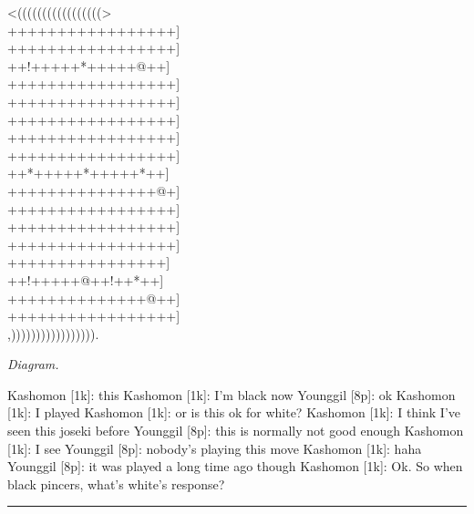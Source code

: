 \documentclass[letterpaper,12pt]{memoir}
\newcounter{GoFigure}[part]
\newcommand{\gofigure}{%
 \stepcounter{GoFigure}
 \centerline{\textit{Diagram.\thinspace\arabic{GoFigure}}}
}
\begin{document}
\begin{minipage}[t]{0.5\textwidth}
{\gnos
<(((((((((((((((((>\\
+++++++++++++++++]\\
+++++++++++++++++]\\
++!+++++*+++++@++]\\
+++++++++++++++++]\\
+++++++++++++++++]\\
+++++++++++++++++]\\
+++++++++++++++++]\\
+++++++++++++++++]\\
++*+++++*+++++*++]\\
+++++++++++++++@+]\\
+++++++++++++++++]\\
+++++++++++++++++]\\
+++++++++++++++++]\\
++++++++++++++++]\\
++!+++++@++!++*++]\\
++++++++++++++@++]\\
+++++++++++++++++]\\
,))))))))))))))))).\\
}
\gofigure
\end{minipage}
\begin{minipage}[t]{0.5\textwidth}
\setlength{\parskip}{0.5em}
Kashomon [1k]: this
Kashomon [1k]: I'm black now
Younggil [8p]: ok
Kashomon [1k]: I played
Kashomon [1k]: or is this ok for white?
Kashomon [1k]: I think I've seen this joseki before
Younggil [8p]: this is normally not good enough
Kashomon [1k]: I see
Younggil [8p]: nobody's playing this move
Kashomon [1k]: haha
Younggil [8p]: it was played a long time ago though
Kashomon [1k]: Ok.  So when black pincers, what's white's response?


\end{minipage}
\vfill

\rule{\textwidth}{0.5pt}
\end{document}
